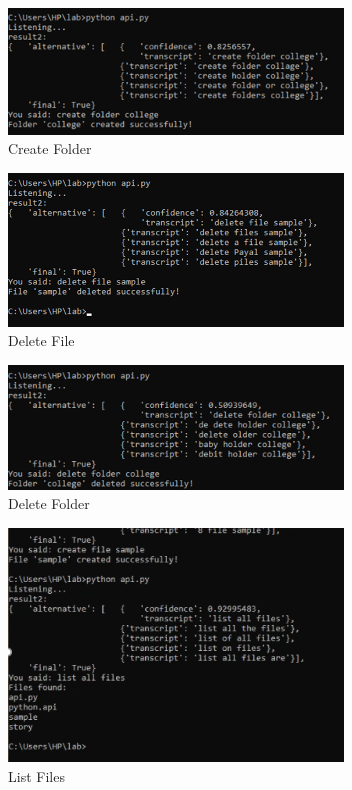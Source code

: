 \documentclass[conference]{IEEEtran}
\begin{document}
\begin{figure}[h]
\centering
\includegraphics[width=3.5in]{3.png}
\caption{Create Folder}
\label{fig:diagram}
\end{figure}

\begin{figure}[h]
\centering
\includegraphics[width=3.5in]{4.png}
\caption{Delete File}
\label{fig:diagram}
\end{figure}

\begin{figure}[h]
\centering
\includegraphics[width=3.5in]{5.png}
\caption{Delete Folder}
\label{fig:diagram}
\end{figure}

\begin{figure}[h]
\centering
\includegraphics[width=3.5in]{6.png}
\caption{List Files}
\label{fig:diagram}
\end{figure}
\end{document}
